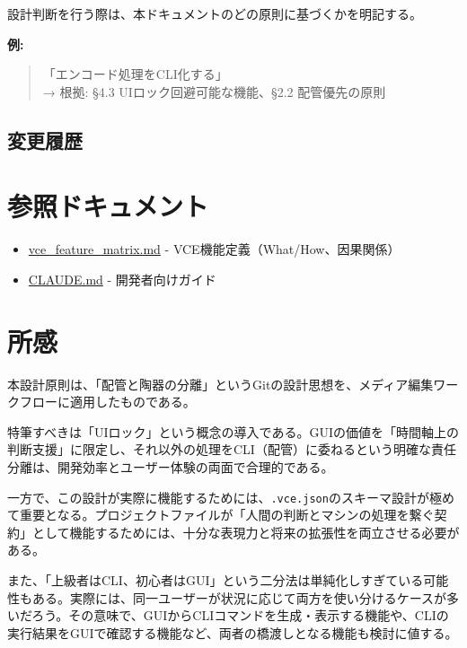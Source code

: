 \documentclass[10pt,a4paper,twocolumn]{ltjsarticle}
\begin{document}
設計判断を行う際は、本ドキュメントのどの原則に基づくかを明記する。

\textbf{例:}
\begin{quote}
「エンコード処理をCLI化する」\\
→ 根拠: §4.3 UIロック回避可能な機能、§2.2 配管優先の原則
\end{quote}

\subsection{変更履歴}

\vspace{0.5\baselineskip}
\vspace{0.5\baselineskip}

\section*{参照ドキュメント}

\begin{itemize}
\item \href{./vce_feature_matrix.md}{vce\_feature\_matrix.md} - VCE機能定義（What/How、因果関係）
\item \href{../CLAUDE.md}{CLAUDE.md} - 開発者向けガイド
\end{itemize}

\section*{所感}

本設計原則は、「配管と陶器の分離」というGitの設計思想を、メディア編集ワークフローに適用したものである。

特筆すべきは「UIロック」という概念の導入である。GUIの価値を「時間軸上の判断支援」に限定し、それ以外の処理をCLI（配管）に委ねるという明確な責任分離は、開発効率とユーザー体験の両面で合理的である。

一方で、この設計が実際に機能するためには、\texttt{.vce.json}のスキーマ設計が極めて重要となる。プロジェクトファイルが「人間の判断とマシンの処理を繋ぐ契約」として機能するためには、十分な表現力と将来の拡張性を両立させる必要がある。

また、「上級者はCLI、初心者はGUI」という二分法は単純化しすぎている可能性もある。実際には、同一ユーザーが状況に応じて両方を使い分けるケースが多いだろう。その意味で、GUIからCLIコマンドを生成・表示する機能や、CLIの実行結果をGUIで確認する機能など、両者の橋渡しとなる機能も検討に値する。
\end{document}
